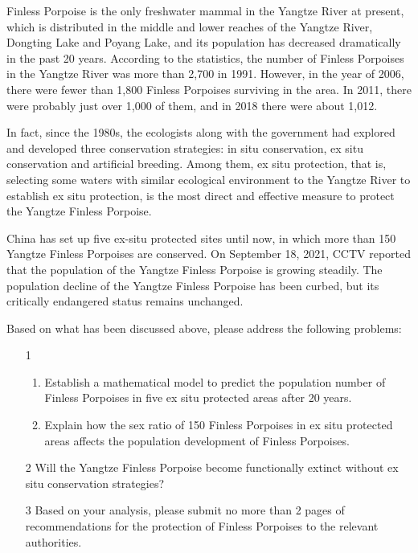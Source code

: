 \documentclass{mcmthesis}
\numberwithin{figure}{section}
\numberwithin{table}{section}
\numberwithin{equation}{section}
\begin{document}
Finless Porpoise is the only freshwater mammal in the Yangtze River at present, 
which is distributed in the middle and lower reaches of the Yangtze 
River, Dongting Lake and Poyang Lake, and its population has 
decreased dramatically in the past 20 years. According to the statistics, 
the number of Finless Porpoises in the Yangtze River was more than 2,700 in 1991. 
However, in the year of 2006, there were fewer than 1,800 Finless Porpoises surviving in the area. 
In 2011, there were probably just over 1,000 of them, and in 2018 there were about 1,012. 
\par
In fact, since the 1980s, the ecologists along with the government
had explored and developed three conservation strategies: 
in situ conservation, ex situ conservation and artificial breeding.
Among them, ex situ protection, that is, selecting some waters with 
similar ecological environment to the Yangtze River to establish 
ex situ protection, is the most direct and effective measure
to protect the Yangtze Finless Porpoise. 
\par
China has set up five ex-situ protected sites until now, in which 
more than 150 Yangtze Finless Porpoises are conserved. On September 18, 2021, CCTV reported that 
the population of the Yangtze Finless Porpoise is growing steadily. 
The population decline of the Yangtze Finless Porpoise has been 
curbed, but its critically endangered status remains unchanged.
\par
Based on what has been discussed above, please address the following problems:
\begin{enumerate}
  \item [1] \begin{enumerate}
    \item Establish a mathematical model to predict the population number of Finless Porpoises in five ex situ protected areas after 20 years.
    \item Explain how the sex ratio of 150 Finless Porpoises in ex situ protected areas affects the population development of Finless Porpoises.
  \end{enumerate}
  \item [2] Will the Yangtze Finless Porpoise become functionally extinct without ex situ conservation strategies?
  \item [3] Based on your analysis, please submit no more than 2 pages of recommendations for the protection of Finless Porpoises to the relevant authorities.
\end{enumerate}
\end{document}
